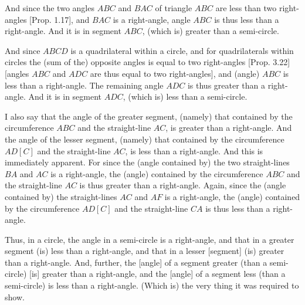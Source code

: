 \begin{Parallel}{}{}
{And since the two angles $ABC$ and $BAC$ of triangle $ABC$ are less than 
two right-angles [Prop. 1.17], and $BAC$ is a right-angle, angle $ABC$ is
thus less than a right-angle. And it is in segment $ABC$, (which is) greater 
than
a semi-circle.

And since $ABCD$ is a quadrilateral within a circle, and for quadrilaterals within circles
the (sum of the) opposite angles is equal to two right-angles 
[Prop. 3.22] [angles $ABC$ and $ADC$ are thus equal to two right-angles],
and (angle) $ABC$ is  less than a right-angle. The remaining angle $ADC$
is thus greater than a right-angle. And it is in segment $ADC$, (which is)
less than a semi-circle.

I also say that the angle of the greater segment, (namely) that contained by
the circumference $ABC$ and the straight-line $AC$, is greater than a right-angle.
And the angle of the lesser segment, (namely) that contained by the circumference
$AD[C]$ and the straight-line $AC$, is less than a right-angle. And
this is immediately apparent. For since the (angle contained by) the
two straight-lines $BA$ and $AC$ is a right-angle, the (angle) contained
by the circumference $ABC$ and the straight-line $AC$ is thus greater than a right-angle. Again, since the (angle contained by) the straight-lines
$AC$ and $AF$ is a right-angle, the (angle) contained by the circumference
$AD[C]$ and the straight-line $CA$ is thus less than a right-angle.

Thus, in a circle, the angle in a semi-circle is a right-angle, and that in a
greater segment (is) less than a right-angle, and that in a
lesser [segment] (is) greater than a right-angle. And, further, the [angle] of
a segment greater (than a semi-circle) [is] greater than a right-angle, and
the [angle] of a segment less (than a semi-circle) is  less than a right-angle.
(Which is) the very thing it was required to show.}
\end{Parallel}

